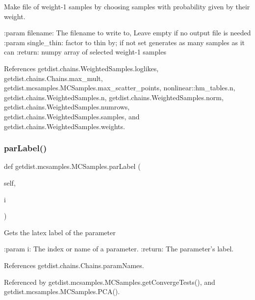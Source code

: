 \begin{DoxyVerb}Make file of weight-1 samples by choosing samples
with probability given by their weight.

:param filename: The filename to write to, Leave empty if no output file is needed
:param single_thin: factor to thin by; if not set generates as many samples as it can
:return: numpy array of selected weight-1 samples
\end{DoxyVerb}
 

References getdist.\+chains.\+Weighted\+Samples.\+loglikes, getdist.\+chains.\+Chains.\+max\+\_\+mult, getdist.\+mcsamples.\+M\+C\+Samples.\+max\+\_\+scatter\+\_\+points, nonlinear\+::hm\+\_\+tables.\+n, getdist.\+chains.\+Weighted\+Samples.\+n, getdist.\+chains.\+Weighted\+Samples.\+norm, getdist.\+chains.\+Weighted\+Samples.\+numrows, getdist.\+chains.\+Weighted\+Samples.\+samples, and getdist.\+chains.\+Weighted\+Samples.\+weights.

\mbox{\label{classgetdist_1_1mcsamples_1_1MCSamples_aec090ebdf609820d084391a9901f0214}} 
\subsubsection{\texorpdfstring{par\+Label()}{parLabel()}}
{\footnotesize\ttfamily def getdist.\+mcsamples.\+M\+C\+Samples.\+par\+Label (\begin{DoxyParamCaption}\item[{}]{self,  }\item[{}]{i }\end{DoxyParamCaption})}

\begin{DoxyVerb}Gets the latex label of the parameter

:param i: The index or name of a parameter.
:return: The parameter's label.
\end{DoxyVerb}
 

References getdist.\+chains.\+Chains.\+param\+Names.



Referenced by getdist.\+mcsamples.\+M\+C\+Samples.\+get\+Converge\+Tests(), and getdist.\+mcsamples.\+M\+C\+Samples.\+P\+C\+A().

